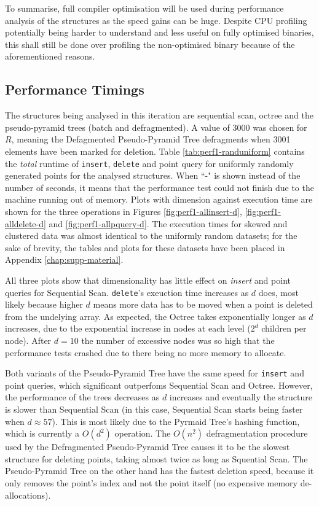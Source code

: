 To summarise, full compiler optimisation will be used during performance analysis of the structures as the speed gains can be huge. Despite CPU profiling potentially being harder to understand and less useful on fully optimised binaries, this shall still be done over profiling the non-optimised binary because of the aforementioned reasons.

\subsection{Performance Timings}

The structures being analysed in this iteration are sequential scan, octree and the pseudo-pyramid trees (batch and defragmented). A value of 3000 was chosen for $R$, meaning the Defagmented Pseudo-Pyramid Tree defragments when 3001 elements have been marked for deletion. Table \ref{tab:perf1-randuniform} contains the \textit{total} runtime of \texttt{insert}, \texttt{delete} and point query for uniformly randomly generated points for the analysed structures. When ``-" is shown instead of the number of seconds, it means that the performance test could not finish due to the machine running out of memory. Plots with dimension against execution time are shown for the three operations in Figures \ref{fig:perf1-allinsert-d}, \ref{fig:perf1-alldelete-d} and \ref{fig:perf1-allpquery-d}. The execution times for skewed and clustered data was almost identical to the uniformly random datasets; for the sake of brevity, the tables and plots for these datasets have been placed in Appendix \ref{chap:supp-material}. 

All three plots show that dimensionality has little effect on \textit{insert} and point queries for Sequential Scan. \texttt{delete}'s exeuction time increases as $d$ does, most likely because higher $d$ means more data has to be moved when a point is deleted from the undelying array. As expected, the Octree takes exponentially longer as $d$ increases, due to the exponential increase in nodes at each level ($2^d$ children per node). After $d = 10$ the number of excessive nodes was so high that the performance tests crashed due to there being no more memory to allocate.

Both variants of the Pseudo-Pyramid Tree have the same speed for \texttt{insert} and point queries, which significant outperfoms Sequential Scan and Octree. However, the performance of the trees decreases as $d$ increases and eventually the structure is slower than Sequential Scan (in this case, Sequential Scan starts being faster when $d \approx 57$). This is most likely due to the Pyrmaid Tree's hashing function, which is currently a $O(d^2)$ operation. The $O(n^2)$ defragmentation procedure used by the Defragmented Pseudo-Pyramid Tree causes it to be the slowest structure for deleting points, taking almost twice as long as Squential Scan. The Pseudo-Pyramid Tree on the other hand has the fastest deletion speed, because it only removes the point's index and not the point itself (no expensive memory de-allocations).


